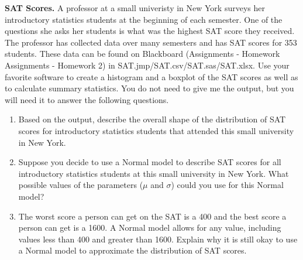 \item  \textbf{SAT Scores.}  A professor at a small univeristy in New York surveys her introductory statistics students at the beginning of each semester.  One of the questions she asks her students is what was the highest SAT score they received.  The professor has collected data over many semesters and has SAT scores for 353 students.  These data can be found on Blackboard (Assignments - Homework Assignments - Homework 2) in SAT.jmp/SAT.csv/SAT.sas/SAT.xlsx.  Use your favorite software to create a histogram and a boxplot of the SAT scores as well as to calculate summary statistics.  You do not need to give me the output, but you will need it to answer the following questions.
\begin{enumerate}
\item   Based on the output, describe the overall shape of the distribution of SAT scores for introductory statistics students that attended this small university in New York.
\item   Suppose you decide to use a Normal model to describe SAT scores for all introductory statistics students at this small university in New York.  What possible values of the parameters ($\mu$ and $\sigma$) could you use for this Normal model?
\item  The worst score a person can get on the SAT is a 400 and the best score a person can get is a 1600.  A Normal model allows for any value, including values less than 400 and greater than 1600.  Explain why it is still okay to use a Normal model to approximate the distribution of SAT scores.  
\end{enumerate}


